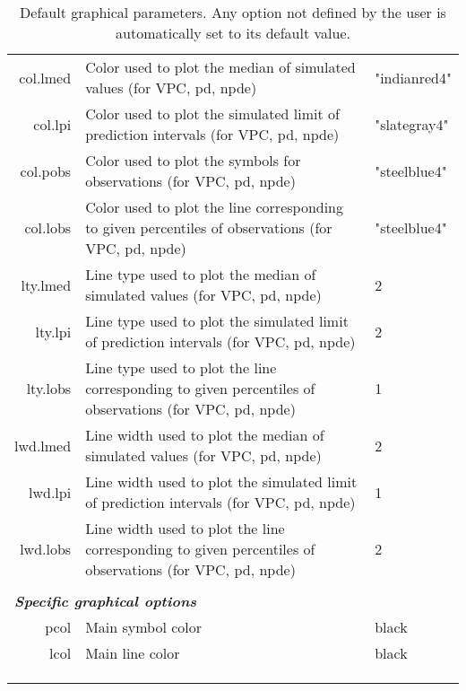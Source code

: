 \begin{center}
\begin{longtable}{r p{8cm} p{3cm}}
{\sf col.lmed} & Color used to plot the median of simulated values (for VPC, pd, npde) & "indianred4" \\
{\sf col.lpi} & Color used to plot the simulated limit of prediction intervals (for VPC, pd, npde) & "slategray4" \\
{\sf col.pobs} & Color used to plot the symbols for observations (for VPC, pd, npde) & "steelblue4" \\
{\sf col.lobs} & Color used to plot the line corresponding to given percentiles of observations (for VPC, pd, npde) & "steelblue4" \\
{\sf lty.lmed} & Line type used to plot the median of simulated values (for VPC, pd, npde) &  2 \\
{\sf lty.lpi} & Line type used to plot the simulated limit of prediction intervals (for VPC, pd, npde) & 2 \\
{\sf lty.lobs} & Line type used to plot the line corresponding to given percentiles of observations (for VPC, pd, npde) & 1 \\
{\sf lwd.lmed} & Line width used to plot the median of simulated values (for VPC, pd, npde) &  2 \\
{\sf lwd.lpi} & Line width used to plot the simulated limit of prediction intervals (for VPC, pd, npde) & 1 \\
{\sf lwd.lobs} & Line width used to plot the line corresponding to given percentiles of observations (for VPC, pd, npde) & 2 \\
& & \\
\multicolumn{3}{l}{{\itshape \bfseries Specific graphical options}} \\
{\sf pcol} & Main symbol color & black \\
{\sf lcol} & Main line color & black \\
{\sf } &  &  \\
\hline
\\
\caption{Default graphical parameters. Any option not defined by the user is automatically set to its default value.} \label{tab:plot.options}
\end{longtable} 
\end{center}
